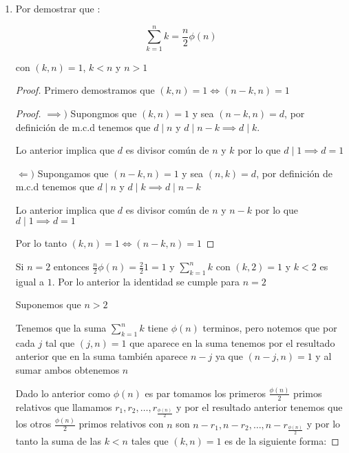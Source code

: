 \documentclass[12pt]{article}
\begin{document}
\begin{enumerate}
\begin{proof}
            \end{proof}
        
        
        \item Por demostrar que :
        
            \begin{equation}
                \sum_{k=1}^n k = \frac{n}{2}\phi(n)
            \end{equation}
            
            con $(k,n) = 1$, $k < n$ y $n > 1$
            
            
            \begin{proof}
            
            Primero demostramos que $(k,n) = 1 \iff (n-k, n) = 1$
            
            \begin{proof}
            
            $\implies)$ Supongmos que $(k,n) = 1$ y sea $(n-k, n) = d$, por definición de m.c.d tenemos que $d \mid n$ y $d \mid n-k \implies d \mid k$.
            
            Lo anterior implica que $d$ es divisor común de $n$ y $k$ por lo que $d \mid 1 \implies d = 1$
            
            $\Longleftarrow)$ Supongamos que $(n-k, n) = 1$ y sea $(n,k) = d$, por definición de m.c.d tenemos que $d \mid n$ y $d \mid k \implies d \mid n - k$
            
            Lo anterior implica que $d$ es divisor común de $n $ y $n - k$ por lo que $d \mid 1 \implies d = 1$
            
            Por lo tanto  $(k,n) = 1 \iff (n-k, n) = 1$
            
            \end{proof}
            
            Si $n = 2$ entonces $\frac{n}{2}\phi(n) = \frac{2}{2} 1 = 1$ y $\sum_{k=1}^n k$ con $(k,2) = 1$ y $k < 2$ es igual a $1$. Por lo anterior la identidad se cumple para $n = 2$
            
            Suponemos que $n > 2$
            
            Tenemos que la suma $\sum_{k=1}^n k$ tiene $\phi(n)$ terminos, pero notemos que por cada $j$ tal que $(j,n) = 1$ que aparece en la suma tenemos por el resultado anterior que en la suma también aparece $n-j$ ya que $(n-j,n) = 1$ y al sumar ambos obtenemos $n$
            
            Dado lo anterior como $\phi(n)$ es par tomamos los primeros $\frac{\phi(n)}{2}$ primos relativos que llamamos $r_1, r_2, \dots , r_{\frac{\phi(n)}{2}}$ y por el resultado anterior tenemos que los otros $\frac{\phi(n)}{2}$ primos relativos con $n$ son $n - r_1, n -r_2, \dots ,n - r_{\frac{\phi(n)}{2}}$ y por lo tanto la suma de las $k < n$ tales que $(k,n) = 1 $ es de la siguiente forma:
            

\end{proof}
\end{enumerate}
\end{document}

